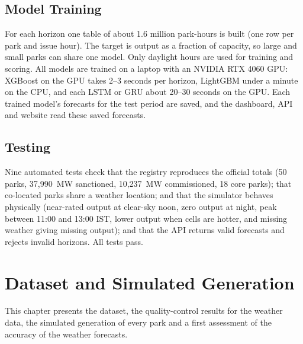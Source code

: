 \documentclass[12pt]{report}
\begin{document}
\section{Model Training}
\vspace{1mm}
For each horizon one table of about 1.6 million park-hours is built (one row per park and issue hour). The target is output as a fraction of capacity, so large and small parks can share one model. Only daylight hours are used for training and scoring. All models are trained on a laptop with an NVIDIA RTX 4060 GPU: XGBoost on the GPU takes 2--3 seconds per horizon, LightGBM under a minute on the CPU, and each LSTM or GRU about 20--30 seconds on the GPU. Each trained model's forecasts for the test period are saved, and the dashboard, API and website read these saved forecasts.

\section{Testing}
\vspace{1mm}
Nine automated tests check that the registry reproduces the official totals (50 parks, 37,990~MW sanctioned, 10,237~MW commissioned, 18 core parks); that co-located parks share a weather location; and that the simulator behaves physically (near-rated output at clear-sky noon, zero output at night, peak between 11:00 and 13:00 IST, lower output when cells are hotter, and missing weather giving missing output); and that the API returns valid forecasts and rejects invalid horizons. All tests pass.

\chapter{Dataset and Simulated Generation}
This chapter presents the dataset, the quality-control results for the weather data, the simulated generation of every park and a first assessment of the accuracy of the weather forecasts.
\end{document}
